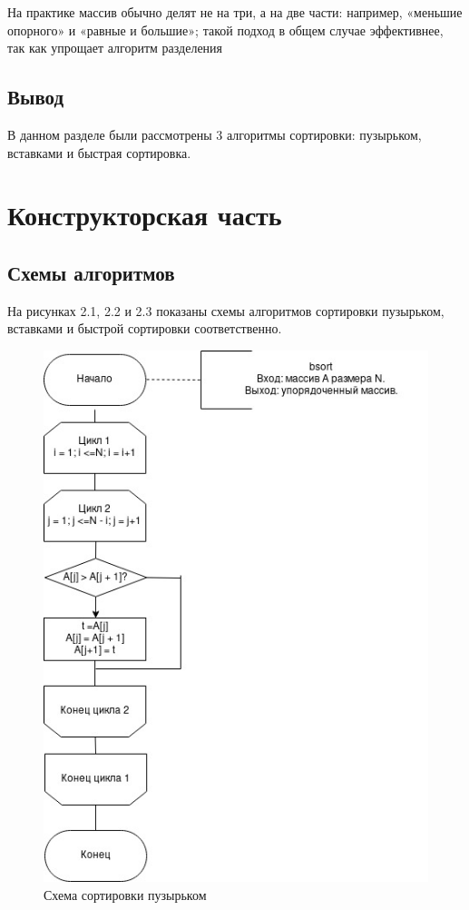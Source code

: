 \documentclass[12pt]{report}
\begin{document}
На практике массив обычно делят не на три, а на две части: например, «меньшие опорного» и «равные и большие»; такой подход в общем случае эффективнее, так как упрощает алгоритм разделения 

\section{Вывод}

В данном разделе были рассмотрены 3 алгоритмы сортировки: пузырьком, вставками и быстрая сортировка.
	
\clearpage

\chapter{Конструкторская часть}

\section{Схемы алгоритмов}

На рисунках 2.1, 2.2 и 2.3 показаны схемы алгоритмов сортировки пузырьком, вставками и быстрой сортировки соответственно.

\begin{figure}[h]
	\centering
	\includegraphics[width=1\linewidth]{bsort.jpg}
	\caption{Схема сортировки пузырьком}
	\label{fig:mpr}
\end{figure}
\end{document}
